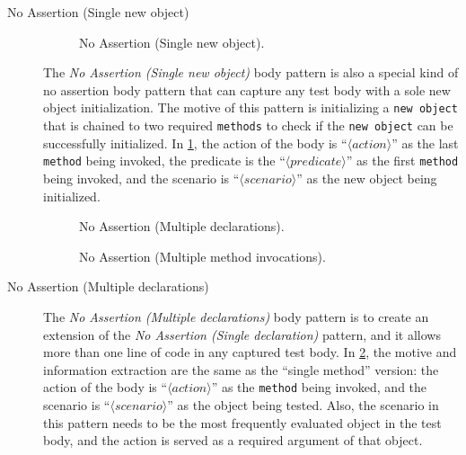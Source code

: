 \documentclass[proposal.tex]{subfiles}
\begin{document}
\begin{description}
\item[No Assertion (Single new object)]

\begin{figure}[t]
\centering
    \begin{subfigure}{0.75\textwidth}
    \end{subfigure}
\caption{No Assertion (Single new object).}
\label{NoAstP_new}
\end{figure}


The \textit{No Assertion (Single new object)} body pattern is also a special kind of no assertion body pattern that can capture any test body with a sole new object initialization.
%
The motive of this pattern is initializing a \texttt{new object} that is chained to two required \texttt{methods} to check if the \texttt{new object} can be successfully initialized.
%
In \cref{NoAstP_new}, the action of the body is \enquote{$\langle action \rangle$} as the last \texttt{method} being invoked, the predicate is the \enquote{$\langle predicate \rangle$} as the first \texttt{method} being invoked, and the scenario is \enquote{$\langle scenario \rangle$} as the new object being initialized.

\begin{figure}[H]
\centering
    \begin{subfigure}{0.7\textwidth}
    \end{subfigure}
\caption{No Assertion (Multiple declarations).}
\label{NoAstP_m_dec}
\end{figure}

\begin{figure}[H]
\centering
    \begin{subfigure}{0.45\textwidth}
    \end{subfigure}
\caption{No Assertion (Multiple method invocations).}
\label{NoAstP_m_MC}
\end{figure}

\item[No Assertion (Multiple declarations)]

The \textit{No Assertion (Multiple declarations)} body pattern is to create an extension of the \textit{No Assertion (Single declaration)} pattern, and it allows more than one line of code in any captured test body.
%
In \cref{NoAstP_m_dec}, the motive and information extraction are the same as the \enquote{single method} version: the action of the body is \enquote{$\langle action \rangle$} as the \texttt{method} being invoked, and the scenario is \enquote{$\langle scenario \rangle$} as the object being tested.
%
Also, the scenario in this pattern needs to be the most frequently evaluated object in the test body, and the action is served as a required argument of that object.



\end{description}
\end{document}
